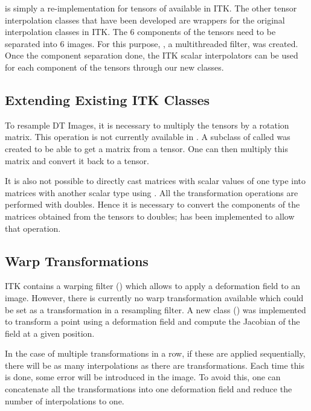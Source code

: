\documentclass{InsightArticle}
\begin{document}
 is simply a re-implementation for tensors of  available in ITK.
The other tensor interpolation classes that have been developed are wrappers for the original interpolation classes in ITK. The 6 components of the tensors need to be separated into 6 images. For this purpose, , a multithreaded filter, was created. Once the component separation done, the ITK scalar interpolators can be used for each component of the tensors through our new classes.

\subsection{Extending Existing ITK Classes}
	
To resample DT Images, it is necessary to multiply the tensors by a rotation matrix. This operation is not currently available in . A subclass of  called  was created to be able to get a matrix from a tensor. One can then multiply this matrix and convert it back to a tensor.

It is also not possible to directly cast matrices with scalar values of one type into matrices with another scalar type using . All the transformation operations are performed with doubles. Hence it is necessary to convert the components of the matrices obtained from the tensors to doubles;  has been implemented to allow that operation.

\subsection{Warp Transformations}

ITK contains a warping filter () which allows to apply a deformation field to an image. However, there is currently no warp transformation available which could be set as a transformation in a resampling filter. A new class () was implemented to transform a point using a deformation field and compute the Jacobian of the field at a given position.

In the case of multiple transformations in a row, if these are applied sequentially, there will be as many interpolations as there are transformations. Each time this is done, some error will be introduced in the image. To avoid this, one can concatenate all the transformations into one deformation field and reduce the number of interpolations to one.
\end{document}
